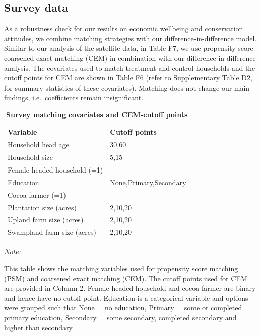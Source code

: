 \documentclass[
]{article}
\begin{document}
\hypertarget{survey-data-2}{%
\subsection{Survey data}\label{survey-data-2}}

As a robustness check for our results on economic wellbeing and
conservation attitudes, we combine matching strategies with our
difference-in-difference model. Similar to our analysis of the satellite
data, in Table F7, we use propensity score coarsened exact matching
(CEM) in combination with our difference-in-difference analysis. The
covariates used to match treatment and control households and the cutoff
points for CEM are shown in Table F6 (refer to Supplementary Table D2,
for summary statistics of these covariates). Matching does not change
our main findings, i.e.~coefficients remain insignificant.

\begin{table}[!h]

\caption{\label{tab:tabBinsSurvey}\textbf{Survey matching covariates and CEM-cutoff points}}
\centering
\begin{threeparttable}
\begin{tabular}[t]{>{\raggedright\arraybackslash}p{20em}l}
\toprule
\textbf{Variable} & \textbf{Cutoff points}\\
\midrule
Household head age & 30,60\\
Household size & 5,15\\
Female headed household (=1) & -\\
Education & None,Primary,Secondary\\
Cocoa farmer (=1) & -\\
Plantation size (acres) & 2,10,20\\
Upland farm size (acres) & 2,10,20\\
Swampland farm size (acres) & 2,10,20\\
\bottomrule
\end{tabular}
\begin{tablenotes}
\item \textit{Note: } 
\item This table shows the matching variables used for propensity score matching (PSM) and coarsened exact matching (CEM). The cutoff points used for CEM are provided in Column 2. Female headed household and cocoa farmer are binary and hence have no cutoff point. Education is a categorical variable and options were grouped such that None = no education, Primary = some or completed primary education, Secondary =  some secondary, completed secondary and higher than secondary
\end{tablenotes}
\end{threeparttable}
\end{table}
\end{document}
